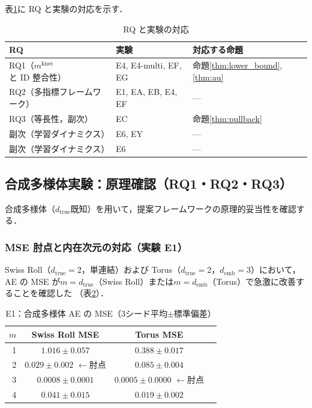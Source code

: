 \documentclass[11pt,a4paper]{jsarticle}
\newcommand{\dtrue}{d_{\mathrm{true}}}
\newcommand{\mknee}{m^{\mathrm{knee}}}
\newcommand{\demb}{d_{\mathrm{emb}}}
\begin{document}
表\ref{tab:rq_exp_map}に RQ と実験の対応を示す．

\begin{table}[H]
\centering
\caption{RQ と実験の対応}
\label{tab:rq_exp_map}
\small
\begin{tabular}{lll}
\toprule
RQ & 実験 & 対応する命題 \\
\midrule
RQ1（$\mknee$と ID 整合性） & E4, E4-multi, EF, EG & 命題\ref{thm:lower_bound},\ref{thm:au} \\
RQ2（多指標フレームワーク） & E1, EA, EB, E4, EF & --- \\
RQ3（等長性，副次） & EC & 命題\ref{thm:pullback} \\
副次（学習ダイナミクス） & E6, EY & --- \\
副次（学習ダイナミクス） & E6 & --- \\
\bottomrule
\end{tabular}
\end{table}

\subsection{合成多様体実験：原理確認（RQ1・RQ2・RQ3）}\label{sec:exp_synthetic}

合成多様体（$\dtrue$既知）を用いて，提案フレームワークの原理的妥当性を確認する．

\subsubsection{MSE 肘点と内在次元の対応（実験 E1）}

Swiss Roll（$\dtrue = 2$，単連結）および Torus（$\dtrue = 2$，$\demb = 3$）において，
AE の MSE が$m = \dtrue$（Swiss Roll）または$m = \demb$（Torus）で急激に改善することを確認した
（表\ref{tab:e1}）．

\begin{table}[H]
\centering
\caption{E1：合成多様体 AE の MSE（3シード平均$\pm$標準偏差）}
\label{tab:e1}
\small
\begin{tabular}{rccc}
\toprule
$m$ & Swiss Roll MSE & Torus MSE \\
\midrule
1 & $1.016\pm0.057$ & $0.388\pm0.017$ \\
2 & $\boldsymbol{0.029\pm0.002}$ $\leftarrow$肘点 & $0.085\pm0.004$ \\
3 & $0.0008\pm0.0001$ & $\boldsymbol{0.0005\pm0.0000}$ $\leftarrow$肘点 \\
4 & $0.041\pm0.015$ & $0.019\pm0.002$ \\
\bottomrule
\end{tabular}
\end{table}
\end{document}
